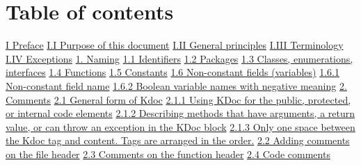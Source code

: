 \section*{Table of contents}
\hspace{0.0cm}\hyperref[sec:]{I Preface}
\hspace{0.5cm}\hyperref[sec:]{ I.I Purpose of this document}
\hspace{0.5cm}\hyperref[sec:]{ I.II General principles}
\hspace{0.5cm}\hyperref[sec:]{ I.III Terminology}
\hspace{0.5cm}\hyperref[sec:]{ I.IV Exceptions}
\hspace{0.0cm}\hyperref[sec:]{}
\hspace{0.0cm}\hyperref[sec:1.]{1. Naming}
\hspace{0.5cm}\hyperref[sec:1.1]{ 1.1 Identifiers}
\hspace{0.5cm}\hyperref[sec:1.2]{ 1.2 Packages}
\hspace{0.5cm}\hyperref[sec:1.3]{ 1.3 Classes, enumerations, interfaces}
\hspace{0.5cm}\hyperref[sec:1.4]{ 1.4 Functions}
\hspace{0.5cm}\hyperref[sec:1.5]{ 1.5 Constants}
\hspace{0.5cm}\hyperref[sec:1.6]{ 1.6 Non-constant fields (variables)}
\hspace{1.0cm}\hyperref[sec:1.6.1]{ 1.6.1 Non-constant field name}
\hspace{1.0cm}\hyperref[sec:1.6.2]{ 1.6.2 Boolean variable names with negative meaning}
\hspace{0.0cm}\hyperref[sec:2.]{2. Comments}
\hspace{0.5cm}\hyperref[sec:2.1]{ 2.1 General form of Kdoc}
\hspace{1.0cm}\hyperref[sec:2.1.1]{ 2.1.1 Using KDoc for the public, protected, or internal code elements}
\hspace{1.0cm}\hyperref[sec:2.1.2]{ 2.1.2 Describing methods that have arguments, a return value, or can throw an exception in the KDoc block}
\hspace{1.0cm}\hyperref[sec:2.1.3]{ 2.1.3 Only one space between the Kdoc tag and content. Tags are arranged in the order.}
\hspace{0.5cm}\hyperref[sec:2.2]{ 2.2 Adding comments on the file header}
\hspace{0.5cm}\hyperref[sec:2.3]{ 2.3 Comments on the function header}
\hspace{0.5cm}\hyperref[sec:2.4]{ 2.4 Code comments}
